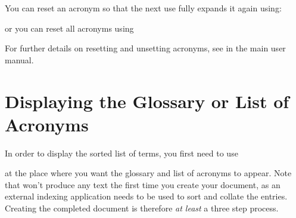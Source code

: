 \documentclass{nlctdoc}
\begin{document}
You can reset an acronym so that the next use fully 
expands it again using:
\begin{definition}
\end{definition}
or you can reset all acronyms using
\begin{definition}
\end{definition}
For further details on resetting and unsetting acronyms, see
in the main  user manual.

\section{Displaying the Glossary or List of Acronyms}
\label{printglossaries}

In order to display the sorted list of terms, you first need to
use
\begin{definition}
\end{definition}
at the place where you want the glossary and list of acronyms to
appear.  Note that  won't produce any text the
first time you create your document, as an external indexing
application needs to be used to sort and collate the entries.
Creating the completed document is therefore \emph{at least} a three
step process.
\end{document}
